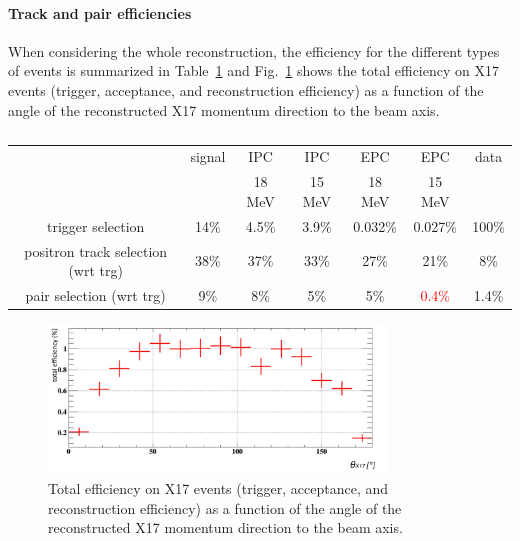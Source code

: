 \begin{refsection}
        \paragraph{Track and pair efficiencies}
        When considering the whole reconstruction, the efficiency for the different types of events is summarized in Table~\ref{tab:X17:efficiency} and Fig.~\ref{fig:X17:totaleff} shows the total efficiency on X17 events (trigger, acceptance, and reconstruction efficiency) as a function of the angle of the reconstructed X17 momentum direction to the beam axis.
        
        \begin{table}[]
            \centering
            \begin{tabular}{|c|c|c|c|c|c|c|}
                 \hline
            &  signal & IPC        & IPC         & EPC      & EPC      & data   \\
            &   & 18 MeV        & 15 MeV         & 18 MeV      & 15 MeV   &    \\
             \hline
                 trigger selection  & 14\% & 4.5\%& 3.9\%&  0.032\% & 0.027\% &  100\%   \\      \hline
                  positron track selection (wrt trg)    & 38\%    & 37\%& 33\%&  27\%& 21\%& 8\%    \\      \hline
                        pair selection (wrt trg)          & 9\% & 8\%& 5\%&  5\% & \textcolor{red}{0.4\%}&   1.4\%  \\      \hline
                \end{tabular}
            \caption{}
            \label{tab:X17:efficiency}
        \end{table}

        \begin{figure}[]
            \centering
            \includegraphics[width=0.8\textwidth]{Figures/X17/Analysis/TotalEff.pdf}
            \caption{Total efficiency on X17 events (trigger, acceptance, and reconstruction efficiency) as a function of the angle of the reconstructed X17 momentum direction to the beam axis.}
            \label{fig:X17:totaleff}
        \end{figure}


\end{refsection}
